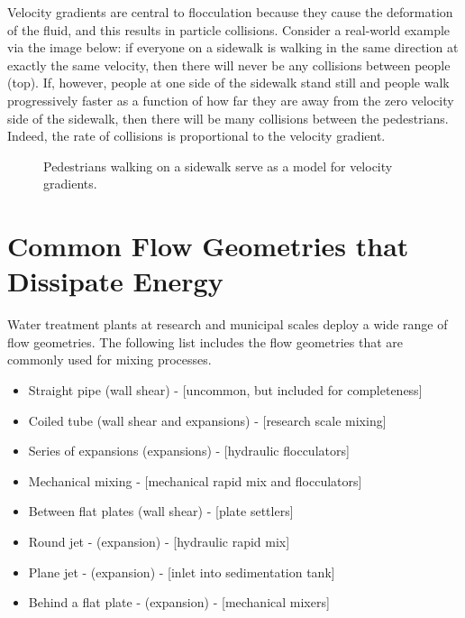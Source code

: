 \documentclass[letterpaper,10pt,english]{sphinxmanual}
\let\sphinxpxdimen\pdfpxdimen\else\newdimen\sphinxpxdimen
\begin{document}
Velocity gradients are central to flocculation because they cause the deformation of the fluid, and this results in particle collisions. Consider a real-world example via the image below: if everyone on a sidewalk is walking in the same direction at exactly the same velocity, then there will never be any collisions between people (top). If, however, people at one side of the sidewalk stand still and people walk progressively faster as a function of how far they are away from the zero velocity side of the sidewalk, then there will be many collisions between the pedestrians. Indeed, the rate of collisions is proportional to the velocity gradient.

\begin{figure}[htbp]
\centering
\capstart

\noindent\sphinxincludegraphics[width=700\sphinxpxdimen]{{Pedestrians_on_sidewalk}.jpg}
\caption{Pedestrians walking on a sidewalk serve as a model for velocity gradients.}\label{\detokenize{Rapid_Mix/RM_Intro:id6}}\label{\detokenize{Rapid_Mix/RM_Intro:figure-pedestrians-on-sidewalk}}\end{figure}


\section{Common Flow Geometries that Dissipate Energy}
\label{\detokenize{Rapid_Mix/RM_Intro:common-flow-geometries-that-dissipate-energy}}
Water treatment plants at research and municipal scales deploy a wide range of flow geometries. The following list includes the flow geometries that are commonly used for mixing processes.
\begin{itemize}
\item {} 
Straight pipe (wall shear) - {[}uncommon, but included for completeness{]}

\item {} 
Coiled tube (wall shear and expansions) - {[}research scale mixing{]}

\item {} 
Series of expansions (expansions) - {[}hydraulic flocculators{]}

\item {} 
Mechanical mixing - {[}mechanical rapid mix and flocculators{]}

\item {} 
Between flat plates (wall shear) - {[}plate settlers{]}

\item {} 
Round jet - (expansion) - {[}hydraulic rapid mix{]}

\item {} 
Plane jet - (expansion) - {[}inlet into sedimentation tank{]}

\item {} 
Behind a flat plate - (expansion) - {[}mechanical mixers{]}

\end{itemize}
\end{document}
